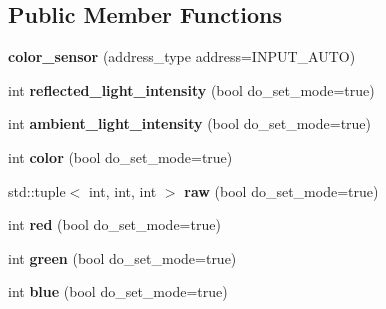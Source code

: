 \subsection*{Public Member Functions}
\begin{DoxyCompactItemize}
\item 
\mbox{\label{classev3dev_1_1color__sensor_a4b13d429c593e691c4a138c99a715cb4}} 
{\bfseries color\+\_\+sensor} (address\+\_\+type address=I\+N\+P\+U\+T\+\_\+\+A\+U\+TO)
\item 
\mbox{\label{classev3dev_1_1color__sensor_a0e0522e2981e88abe4475d5c8c5bfc8c}} 
int {\bfseries reflected\+\_\+light\+\_\+intensity} (bool do\+\_\+set\+\_\+mode=true)
\item 
\mbox{\label{classev3dev_1_1color__sensor_acae50182868779cafa4344789ca9aefa}} 
int {\bfseries ambient\+\_\+light\+\_\+intensity} (bool do\+\_\+set\+\_\+mode=true)
\item 
\mbox{\label{classev3dev_1_1color__sensor_a4942664ad18bc69b0e24abf20a9383a2}} 
int {\bfseries color} (bool do\+\_\+set\+\_\+mode=true)
\item 
\mbox{\label{classev3dev_1_1color__sensor_a2a8d8b7ad890beb410617a50ce9253e4}} 
std\+::tuple$<$ int, int, int $>$ {\bfseries raw} (bool do\+\_\+set\+\_\+mode=true)
\item 
\mbox{\label{classev3dev_1_1color__sensor_a5d23e5153309f1609b8f21b1e623de6e}} 
int {\bfseries red} (bool do\+\_\+set\+\_\+mode=true)
\item 
\mbox{\label{classev3dev_1_1color__sensor_ade83d2aec60c4cd70276c629ec4711ef}} 
int {\bfseries green} (bool do\+\_\+set\+\_\+mode=true)
\item 
\mbox{\label{classev3dev_1_1color__sensor_ac46c6cad8731aa939a8373b82ecff3f8}} 
int {\bfseries blue} (bool do\+\_\+set\+\_\+mode=true)
\end{DoxyCompactItemize}
